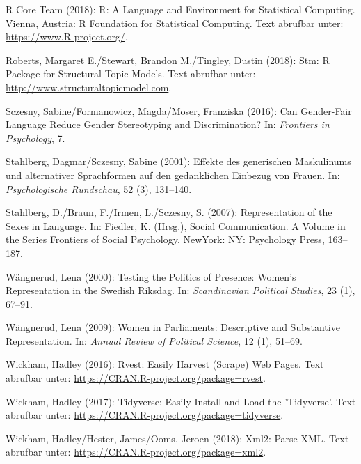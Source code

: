 \documentclass[12pt,ngerman,]{article}
\begin{document}
\leavevmode\hypertarget{ref-rcoreteam_2018}{}%
R Core Team (2018): R: A Language and Environment for Statistical
Computing. Vienna, Austria: R Foundation for Statistical Computing. Text
abrufbar unter: \url{https://www.R-project.org/}.

\leavevmode\hypertarget{ref-roberts_2018}{}%
Roberts, Margaret E./Stewart, Brandon M./Tingley, Dustin (2018): Stm: R
Package for Structural Topic Models. Text abrufbar unter:
\url{http://www.structuraltopicmodel.com}.

\leavevmode\hypertarget{ref-sczesny_2016}{}%
Sczesny, Sabine/Formanowicz, Magda/Moser, Franziska (2016): Can
Gender-Fair Language Reduce Gender Stereotyping and Discrimination? In:
\emph{Frontiers in Psychology}, 7.

\leavevmode\hypertarget{ref-stahlberg_2001}{}%
Stahlberg, Dagmar/Sczesny, Sabine (2001): Effekte des generischen
Maskulinums und alternativer Sprachformen auf den gedanklichen Einbezug
von Frauen. In: \emph{Psychologische Rundschau}, 52 (3), 131--140.

\leavevmode\hypertarget{ref-stahlberg_2007}{}%
Stahlberg, D./Braun, F./Irmen, L./Sczesny, S. (2007): Representation of
the Sexes in Language. In: Fiedler, K. (Hrsg.), Social Communication. A
Volume in the Series Frontiers of Social Psychology. NewYork: NY:
Psychology Press, 163--187.

\leavevmode\hypertarget{ref-wangnerud_2000}{}%
Wängnerud, Lena (2000): Testing the Politics of Presence: Women's
Representation in the Swedish Riksdag. In: \emph{Scandinavian Political
Studies}, 23 (1), 67--91.

\leavevmode\hypertarget{ref-wangnerud_2009}{}%
Wängnerud, Lena (2009): Women in Parliaments: Descriptive and
Substantive Representation. In: \emph{Annual Review of Political
Science}, 12 (1), 51--69.

\leavevmode\hypertarget{ref-wickham_2016}{}%
Wickham, Hadley (2016): Rvest: Easily Harvest (Scrape) Web Pages. Text
abrufbar unter: \url{https://CRAN.R-project.org/package=rvest}.

\leavevmode\hypertarget{ref-wickham_2017}{}%
Wickham, Hadley (2017): Tidyverse: Easily Install and Load the
'Tidyverse'. Text abrufbar unter:
\url{https://CRAN.R-project.org/package=tidyverse}.

\leavevmode\hypertarget{ref-wickham_2018}{}%
Wickham, Hadley/Hester, James/Ooms, Jeroen (2018): Xml2: Parse XML. Text
abrufbar unter: \url{https://CRAN.R-project.org/package=xml2}.




\newpage
\singlespacing 
\end{document}
